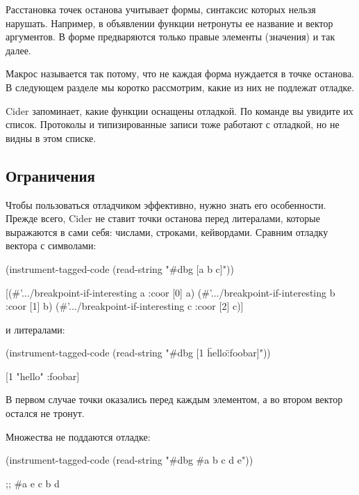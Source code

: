 Расстановка точек останова учитывает формы, синтаксис которых нельзя нарушать. Например, в объявлении функции нетронуты ее название и вектор аргументов. В форме  предваряются только правые элементы (значения) и так далее.

Макрос  называется так потому, что не каждая форма нуждается в точке останова. В следующем разделе мы коротко рассмотрим, какие из них не подлежат отладке.

Cider запоминает, какие функции оснащены отладкой. По команде  вы увидите их список. Протоколы и типизированные записи тоже работают с отладкой, но не видны в этом списке.

\subsection{Ограничения}

Чтобы пользоваться отладчиком эффективно, нужно знать его особенности. Прежде всего, Cider не ставит точки останова перед литералами, которые выражаются в сами себя: числами, строками, кейвордами. Сравним отладку вектора с символами:

\begin{english}
  \begin{clojure}
(instrument-tagged-code
 (read-string "#dbg [a b c]"))

[(#'.../breakpoint-if-interesting a {:coor [0]} a)
 (#'.../breakpoint-if-interesting b {:coor [1]} b)
 (#'.../breakpoint-if-interesting c {:coor [2]} c)]
  \end{clojure}
\end{english}

\noindent
и литералами:

\begin{english}
  \begin{clojure}
(instrument-tagged-code
 (read-string "#dbg [1 \"hello\" :foobar]"))

[1 "hello" :foobar]
  \end{clojure}
\end{english}

В первом случае точки оказались перед каждым элементом, а во втором вектор остался не тронут.

Множества не поддаются отладке:

\begin{english}
  \begin{clojure}
(instrument-tagged-code
 (read-string "#dbg #{a b c d e}"))

;; #{a e c b d}
  \end{clojure}
\end{english}

